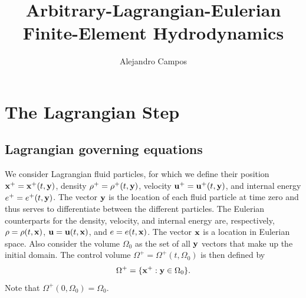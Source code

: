 \documentclass[11pt]{report}
\title{Arbitrary-Lagrangian-Eulerian Finite-Element Hydrodynamics}
\author{Alejandro Campos}
\begin{document}
\maketitle
\tableofcontents

\chapter{The Lagrangian Step}
\section{Lagrangian governing equations}
We consider Lagrangian fluid particles, for which we define their position $\mathbf{x}^+=\mathbf{x}^+(t,\mathbf{y})$, density $\rho^+ = \rho^+(t,\mathbf{y})$, velocity $\mathbf{u}^+ = \mathbf{u}^+(t,\mathbf{y})$, and internal energy $e^+ = e^+(t,\mathbf{y})$. The vector $\mathbf{y}$ is the location of each fluid particle at time zero and thus serves to differentiate between the different particles. The Eulerian counterparts for the density, velocity, and internal energy are, respectively, $\rho = \rho(t,\mathbf{x})$, $\mathbf{u} = \mathbf{u}(t,\mathbf{x})$, and $e = e(t,\mathbf{x})$. The vector $\mathbf{x}$ is a location in Eulerian space. Also consider the volume $\Omega_0$ as the set of all $\mathbf{y}$ vectors that make up the initial domain. The control volume $\Omega^+ = \Omega^+(t, \Omega_0)$ is then defined by
\begin{equation}
    \Omega^+ = \{ \mathbf{x}^+:\mathbf{y} \in \Omega_0 \}.
\end{equation}
Note that $\Omega^+(0,\Omega_0) = \Omega_0$.
\end{document}
